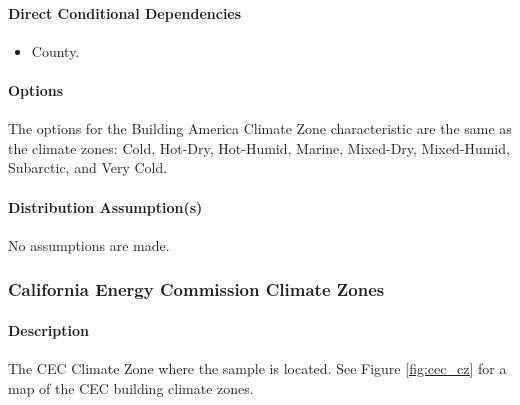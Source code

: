 \paragraph{Direct Conditional Dependencies}
\begin{itemize}
    \item County.
\end{itemize}

\paragraph{Options}
The options for the Building America Climate Zone characteristic are the same as the climate zones: Cold, Hot-Dry, Hot-Humid, Marine, Mixed-Dry, Mixed-Humid, Subarctic, and Very Cold.

\paragraph{Distribution Assumption(s)}
No assumptions are made.

\subsubsection{California Energy Commission Climate Zones}
\paragraph{Description}
The CEC Climate Zone where the sample is located. See Figure \ref{fig:cec_cz} for a map of the CEC building climate zones.

